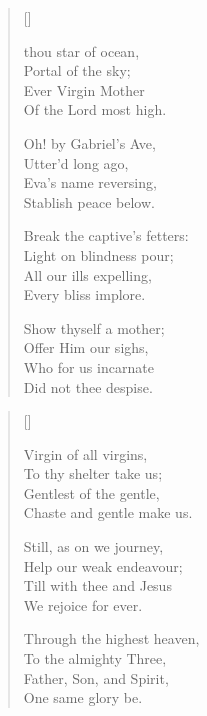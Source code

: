  \newHymn



\settowidth{\versewidth}{Of the Lord most high.}
\begin{multicols}{2}
\begin{verse}[\versewidth]

 thou star of ocean,\\
    Portal of the sky;\\
Ever Virgin Mother\\
    Of the Lord most high.
\pointorig
    
Oh! by Gabriel's Ave,\\
    Utter'd long ago,\\
        Eva's name reversing,\\
    Stablish peace below.
    
Break the captive's fetters:\\
    Light on blindness pour;\\
        All our ills expelling,\\
    Every bliss implore.
    
Show thyself a mother;\\
    Offer Him our sighs,\\
        Who for us incarnate\\
    Did not thee despise.

\end{verse}
\end{multicols} 
\pointorig
   
\begin{multicols}{2}
\begin{verse}[\versewidth]

Virgin of all virgins,\\
    To thy shelter take us;\\
        Gentlest of the gentle,\\
    Chaste  and  gentle  make us.
    

Still, as on we journey,\\
    Help our weak endeavour;\\
        Till with thee and Jesus\\
    We rejoice for ever.
    
Through the highest heaven,\\
    To the almighty Three,\\
        Father, Son, and Spirit,\\
    One same glory be.

\end{verse}
\end{multicols}


